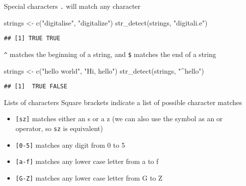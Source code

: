 \documentclass[
  10pt,
  ignorenonframetext,
  aspectratio=169]{beamer}
\newenvironment{Shaded}{\begin{snugshade}}{\end{snugshade}}
\newcommand{\FunctionTok}[1]{\textcolor[rgb]{0.94,0.94,0.56}{#1}}
\newcommand{\NormalTok}[1]{\textcolor[rgb]{0.80,0.80,0.80}{#1}}
\newcommand{\OtherTok}[1]{\textcolor[rgb]{0.94,0.94,0.56}{#1}}
\newcommand{\StringTok}[1]{\textcolor[rgb]{0.80,0.58,0.58}{#1}}
\providecommand{\tightlist}{%
  \setlength{\itemsep}{0pt}\setlength{\parskip}{0pt}}
\begin{document}
\begin{frame}[fragile]{Special characters}
\protect\hypertarget{special-characters}{}
\texttt{.} will match any character

\scriptsize

\begin{Shaded}
\begin{Highlighting}[]
\NormalTok{strings }\OtherTok{\textless{}{-}} \FunctionTok{c}\NormalTok{(}\StringTok{"digitalise"}\NormalTok{, }\StringTok{"digitalize"}\NormalTok{)}
\FunctionTok{str\_detect}\NormalTok{(strings, }\StringTok{"digitali.e"}\NormalTok{)}
\end{Highlighting}
\end{Shaded}

\begin{verbatim}
## [1] TRUE TRUE
\end{verbatim}

\normalsize

\texttt{\^{}} matches the beginning of a string, and \texttt{\$} matches
the end of a string

\normalsize

\begin{Shaded}
\begin{Highlighting}[]
\NormalTok{strings }\OtherTok{\textless{}{-}} \FunctionTok{c}\NormalTok{(}\StringTok{"hello world"}\NormalTok{, }\StringTok{"Hi, hello"}\NormalTok{)}
\FunctionTok{str\_detect}\NormalTok{(strings, }\StringTok{"\^{}hello"}\NormalTok{)}
\end{Highlighting}
\end{Shaded}

\begin{verbatim}
## [1]  TRUE FALSE
\end{verbatim}
\end{frame}

\begin{frame}[fragile]{Lists of characters}
\protect\hypertarget{lists-of-characters}{}
Square brackets indicate a list of possible character matches

\begin{itemize}
\tightlist
\item
  \texttt{{[}sz{]}} matches either an s or a z (we can also use the
  \texttt{\textbar{}} symbol as an or operator, so \texttt{s\textbar{}z}
  is equivalent)
\item
  \texttt{{[}0-5{]}} matches any digit from 0 to 5
\item
  \texttt{{[}a-f{]}} matches any lower case letter from a to f
\item
  \texttt{{[}G-Z{]}} matches any lower case letter from G to Z
\end{itemize}
\end{frame}
\end{document}
